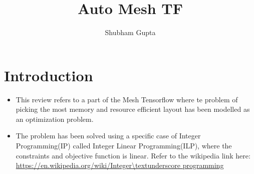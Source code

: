 \documentclass[a4paper]{article}
\title{Auto Mesh TF}
\author{Shubham Gupta}
\begin{document}
\maketitle
\section{Introduction}
\begin{itemize}
    \item This review refers to a part of the Mesh Tensorflow where te problem of picking the most memory and resource efficient layout has been modelled as an optimization problem.
    \item The problem has been solved using a specific case of Integer Programming(IP) called Integer Linear Programming(ILP), where the constraints and objective function is linear. Refer to the wikipedia link here: \url{https://en.wikipedia.org/wiki/Integer\textunderscore programming}
\end{itemize}
\end{document}
